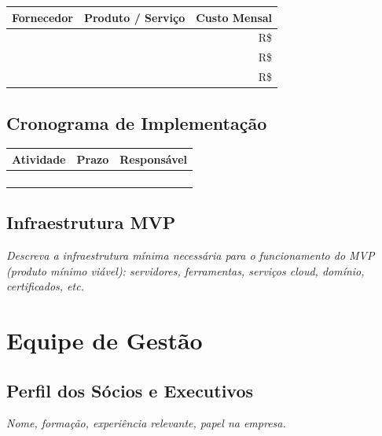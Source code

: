\documentclass[
	12pt,
	openright,
	oneside,
	a4paper,
	chapter=TITLE,
	section=TITLE,
	english,
	brazil
	]{abntex2}
\newcommand{\tcampo}[1]{%
	{#1}%
}
\newcommand{\instrucao}[1]{%
	\vspace{0.3cm}%
	\noindent%
	{%
		\setlength{\fboxsep}{6pt}%
		\colorbox{azul-claro}{%
			\begin{minipage}{\dimexpr\textwidth-2\fboxsep\relax}%
				\setlength{\parindent}{1.25cm}%
				{\color{cinza-instrucao}\small\itshape #1}%
			\end{minipage}%
		}%
	}%
	\vspace{0.3cm}%
}
\begin{document}
\centering
\begin{tabularx}{\textwidth}{X X r}
\toprule
\rowcolor{azul-claro}
\textbf{Fornecedor} & \textbf{Produto / Serviço} & \textbf{Custo Mensal} \\
\midrule
\tcampo{} & \tcampo{} & R\$ \tcampo{} \\
\tcampo{} & \tcampo{} & R\$ \tcampo{} \\
\tcampo{} & \tcampo{} & R\$ \tcampo{} \\
\bottomrule
\end{tabularx}

\section{Cronograma de Implementação}

\begin{tabularx}{\textwidth}{X X X}
\toprule
\rowcolor{azul-claro}
\textbf{Atividade} & \textbf{Prazo} & \textbf{Responsável} \\
\midrule
\tcampo{} & \tcampo{} & \tcampo{} \\
\tcampo{} & \tcampo{} & \tcampo{} \\
\tcampo{} & \tcampo{} & \tcampo{} \\
\tcampo{} & \tcampo{} & \tcampo{} \\
\bottomrule
\end{tabularx}

\section{Infraestrutura MVP}

\instrucao{Descreva a infraestrutura mínima necessária para o funcionamento do MVP (produto mínimo viável): servidores, ferramentas, serviços cloud, domínio, certificados, etc.}

\clearpage

\chapter{Equipe de Gestão}

\section{Perfil dos Sócios e Executivos}

\instrucao{Nome, formação, experiência relevante, papel na empresa.}
\end{document}

